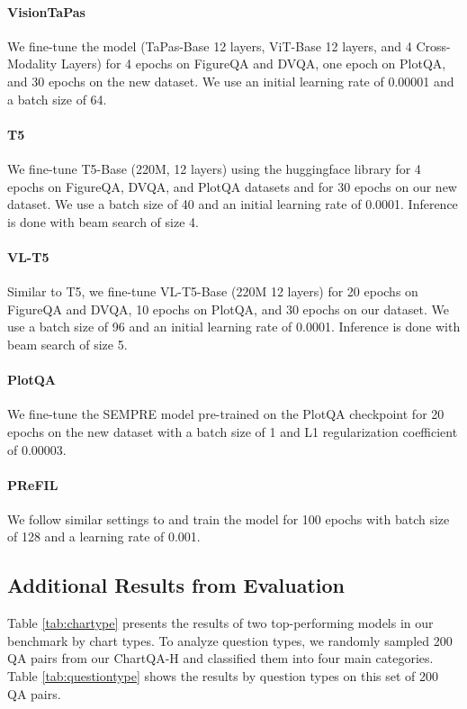 \paragraph{VisionTaPas} We fine-tune the model (TaPas-Base 12 layers, ViT-Base 12 layers, and 4 Cross-Modality Layers) for 4 epochs on FigureQA and DVQA, one epoch on PlotQA, and 30 epochs on the new dataset. We use an initial learning rate of 0.00001 and a batch size of 64.

\paragraph{T5} We fine-tune T5-Base (220M, 12 layers) using the huggingface library \cite{huggingface} for 4 epochs on FigureQA, DVQA, and PlotQA datasets and for 30 epochs on our new dataset. We use a batch size of 40 and an initial learning rate of 0.0001. Inference is done with beam search of size 4. 

\paragraph{VL-T5} Similar to T5, we fine-tune VL-T5-Base (220M 12 layers) for 20 epochs on FigureQA and DVQA, 10 epochs on PlotQA, and 30 epochs on our dataset. We use a batch size of 96 and an initial learning rate of 0.0001. Inference is done with beam search of size 5.

\paragraph{PlotQA} We fine-tune the SEMPRE model \cite{sempre} pre-trained on the PlotQA \cite{plotqa} checkpoint for 20 epochs on the new dataset with a batch size of 1 and L1 regularization coefficient of 0.00003.

\paragraph{PReFIL} We follow similar settings 
to \citet{prefil} and train the model for 100 epochs with batch size of 128 and a learning rate of 0.001. 




\subsection{Additional Results from Evaluation}
\label{app:results}

Table \ref{tab:chartype} presents the results of two top-performing models in our benchmark by chart types. To analyze question types, we randomly sampled 200 QA pairs from our ChartQA-H and classified them into four main categories.  Table \ref{tab:questiontype} shows the results by question types on this set of 200 QA pairs. 

